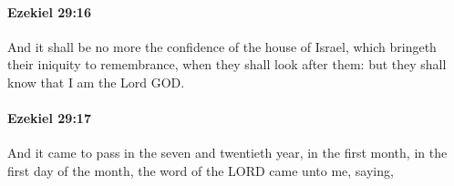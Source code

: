 		\paragraph{Ezekiel 29:16} %
			\label{EZEKIEL-29-16}

			And it shall be no more the confidence of the house of Israel, which bringeth their iniquity to remembrance, when they shall look after them: but they shall know that I am the Lord GOD.


		\paragraph{Ezekiel 29:17} %
			\label{EZEKIEL-29-17}

			And it came to pass in the seven and twentieth year, in the first month, in the first day of the month, the word of the LORD came unto me, saying,


